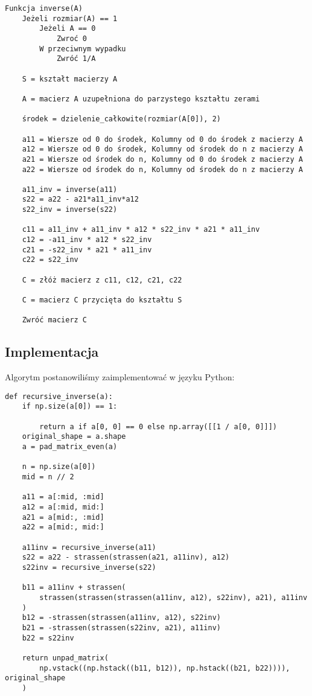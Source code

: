 \documentclass{article}
\begin{document}
\begin{verbatim}
Funkcja inverse(A)
    Jeżeli rozmiar(A) == 1
        Jeżeli A == 0
            Zwroć 0
        W przeciwnym wypadku
            Zwróć 1/A

    S = kształt macierzy A

    A = macierz A uzupełniona do parzystego kształtu zerami

    środek = dzielenie_całkowite(rozmiar(A[0]), 2) 
    
    a11 = Wiersze od 0 do środek, Kolumny od 0 do środek z macierzy A
    a12 = Wiersze od 0 do środek, Kolumny od środek do n z macierzy A
    a21 = Wiersze od środek do n, Kolumny od 0 do środek z macierzy A
    a22 = Wiersze od środek do n, Kolumny od środek do n z macierzy A
    
    a11_inv = inverse(a11)
    s22 = a22 - a21*a11_inv*a12
    s22_inv = inverse(s22)

    c11 = a11_inv + a11_inv * a12 * s22_inv * a21 * a11_inv
    c12 = -a11_inv * a12 * s22_inv
    c21 = -s22_inv * a21 * a11_inv
    c22 = s22_inv

    C = złóż macierz z c11, c12, c21, c22

    C = macierz C przycięta do kształtu S

    Zwróć macierz C
\end{verbatim}

\subsection{Implementacja}

Algorytm postanowiliśmy zaimplementować w języku Python:

\begin{verbatim}
def recursive_inverse(a):
    if np.size(a[0]) == 1:

        return a if a[0, 0] == 0 else np.array([[1 / a[0, 0]]])
    original_shape = a.shape
    a = pad_matrix_even(a)

    n = np.size(a[0])
    mid = n // 2

    a11 = a[:mid, :mid]
    a12 = a[:mid, mid:]
    a21 = a[mid:, :mid]
    a22 = a[mid:, mid:]

    a11inv = recursive_inverse(a11)
    s22 = a22 - strassen(strassen(a21, a11inv), a12)
    s22inv = recursive_inverse(s22)

    b11 = a11inv + strassen(
        strassen(strassen(strassen(a11inv, a12), s22inv), a21), a11inv
    )
    b12 = -strassen(strassen(a11inv, a12), s22inv)
    b21 = -strassen(strassen(s22inv, a21), a11inv)
    b22 = s22inv

    return unpad_matrix(
        np.vstack((np.hstack((b11, b12)), np.hstack((b21, b22)))), original_shape
    )
\end{verbatim}
\end{document}

